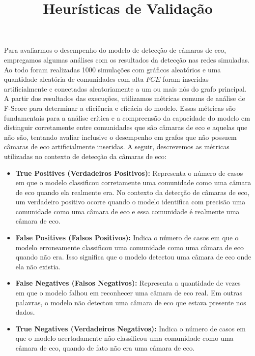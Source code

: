 Para avaliarmos o desempenho do modelo de detecção de câmaras de eco, empregamos algumas análises com os resultados da detecção nas redes simuladas. Ao todo foram realizadas 1000 simulações com gráficos aleatórios e uma quantidade aleatória de comunidades com alta $FCE$ foram inseridas artificialmente e conectadas aleatoriamente a um ou mais nós do grafo principal. A partir dos resultados das execuções, utilizamos métricas comuns de análise de F-Score para determinar a eficiência e eficácia do modelo. Essas métricas são fundamentais para a análise crítica e a compreensão da capacidade do modelo em distinguir corretamente entre comunidades que são câmaras de eco e aquelas que não são, tentando avaliar inclusive o desempenho em grafos que não possuem câmaras de eco artificialmente inseridas. A seguir, descrevemos as métricas utilizadas no contexto de detecção da câmaras de eco:

\begin{itemize}
	\title{Heurísticas de Validação}
	\item \textbf{True Positives (Verdadeiros Positivos):} Representa o número de casos em que o modelo classificou corretamente uma comunidade como uma câmara de eco quando ela realmente era. No contexto da detecção de câmaras de eco, um verdadeiro positivo ocorre quando o modelo identifica com precisão uma comunidade como uma câmara de eco e essa comunidade é realmente uma câmara de eco.
	\item \textbf{False Positives (Falsos Positivos):} Indica o número de casos em que o modelo erroneamente classificou uma comunidade como uma câmara de eco quando não era. Isso significa que o modelo detectou uma câmara de eco onde ela não existia.
	\item \textbf{False Negatives (Falsos Negativos):} Representa a quantidade de vezes em que o modelo falhou em reconhecer uma câmara de eco real. Em outras palavras, o modelo não detectou uma câmara de eco que estava presente nos dados.
	\item \textbf{True Negatives (Verdadeiros Negativos):} Indica o número de casos em que o modelo acertadamente não classificou uma comunidade como uma câmara de eco, quando de fato não era uma câmara de eco.
\end{itemize}

